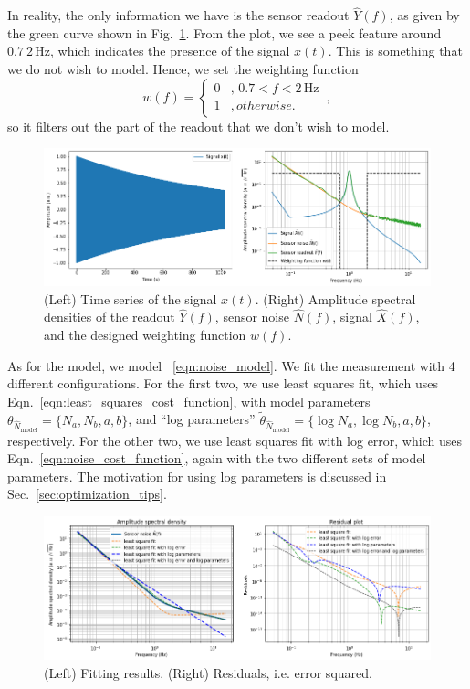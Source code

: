 In reality, the only information we have is the sensor readout $\hat{Y}(f)$, as given by the green curve shown in Fig.~\ref{fig:tutorialsnoisespectrummodelingwithoptimization10}.
From the plot, we see a peek feature around $0.7 ~ 2\,\mathrm{Hz}$, which indicates the presence of the signal $x(t)$.
This is something that we do not wish to model.
Hence, we set the weighting function
\begin{equation}
	w(f)=
	\begin{cases}
		0 & ,\,0.7<f<2\,\mathrm{Hz}\\
		1 & , otherwise.
	\end{cases}
	\,,
\end{equation}
so it filters out the part of the readout that we don't wish to model.
\begin{figure}[!h]
	\centering
	\includegraphics[width=1\linewidth]{figures/tutorials_noise_spectrum_modeling_with_optimization_1_0}
	\caption{(Left) Time series of the signal $x(t)$. (Right) Amplitude spectral densities of the readout $\hat{Y}(f)$, sensor noise $\hat{N}(f)$, signal $\hat{X}(f)$, and the designed weighting function $w(f)$.}
	\label{fig:tutorialsnoisespectrummodelingwithoptimization10}
\end{figure}

As for the model, we model ~\eqref{eqn:noise_model}.
We fit the measurement with 4 different configurations.
For the first two, we use least squares fit, which uses Eqn.~\eqref{eqn:least_squares_cost_function}, with model parameters $\theta_{\hat{N}_\mathrm{model}}=\{N_a, N_b, a, b\}$, and ``log parameters'' $\tilde{\theta}_{\hat{N}_\mathrm{model}}=\{\log N_a, \log N_b, a, b\}$, respectively.
For the other two, we use least squares fit with log error, which uses Eqn.~\eqref{eqn:noise_cost_function}, again with the two different sets of model parameters.
The motivation for using log parameters is discussed in Sec.~\ref{sec:optimization_tips}.


\begin{figure}[!h]
	\centering
	\includegraphics[width=1\linewidth]{figures/tutorials_noise_spectrum_modeling_with_optimization_8_0}
	\caption{(Left) Fitting results. (Right) Residuals, i.e. error squared.}
	\label{fig:tutorialsnoisespectrummodelingwithoptimization80}
\end{figure}

